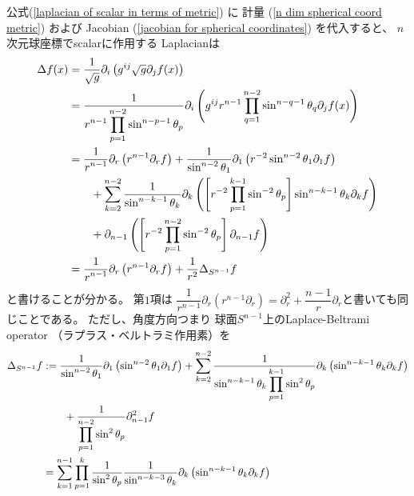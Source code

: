 公式(\ref{laplacian of scalar in terms of metric})
に
計量
(\ref{n dim spherical coord metric})
および
Jacobian
(\ref{jacobian for spherical coordinates})
を代入すると、
$n$次元球座標でscalarに作用する
Laplacianは
\begin{align}
    \Delta f(x)
&=
    \dfrac{1}{ \sqrt {g} }
    \partial_i
    \left(
        g^{ij}
        \sqrt{ g }
        \partial_j
        f (x)
    \right)
\notag\\&
=
    \dfrac{1}{
    \displaystyle
        r^{n-1}
        \prod_{p = 1}^{n-2}
        \sin^{n - p - 1} \theta_p
    }
    \partial_i
    \left(
        g^{ij}
        r^{n-1}
        \prod_{q = 1}^{n-2}
        \sin^{n - q - 1} \theta_q
        \partial_j
        f (x)
    \right)
\notag\\&
=
    \dfrac{1}{
    \displaystyle
        r^{n-1}
    }
    \partial_r
    \left(
        r^{n-1}
        \partial_r
        f
    \right)
+
    \dfrac{1}{
    \displaystyle
        \sin^{n - 2} \theta_1
    }
    \partial_1
    \left(
        r^{-2}
        \sin^{n - 2} \theta_1
        \partial_1
        f
    \right)
\notag\\&\qquad
+
\sum_{k = 2}^{n-2}
    \dfrac{1}{
    \displaystyle
        \sin^{n - k - 1} \theta_k
    }
    \partial_k
    \left(
    \left[
        r^{-2}
        \prod_{p=1}^{k-1}
        \sin^{-2} \theta_p
    \right]
        \sin^{n - k - 1} \theta_k
        \partial_k
        f
    \right)
\notag\\&\qquad
+
    \partial_{n-1}
    \left(
        \left[
            r^{-2}
            \prod_{p=1}^{n-2}
            \sin^{-2} \theta_p
        \right]
        \partial_{n-1}
        f
    \right)
\notag\\&
=
    \dfrac{1}{
    \displaystyle
        r^{n-1}
    }
    \partial_r
    \left(
        r^{n-1}
        \partial_r
        f
    \right)
+
    \dfrac{1}{r^2}
        \Delta_{S^{n-1}}
        f
\end{align}
と書けることが分かる。
第$1$項は
$    \dfrac{1}{
    \displaystyle
        r^{n-1}
    }
    \partial_r
    \left(
        r^{n-1}
        \partial_r
    \right)
=
    \partial_r^2
    +
    \dfrac{n-1}{ r }
        \partial_r
$と書いても同じことである。
ただし、角度方向つまり
球面$S^{n-1}$上のLaplace-Beltrami operator
（ラプラス・ベルトラミ作用素）を
\begin{align}
    \Delta_{S^{n-1}} f
&:=
        \dfrac{1}{
    \displaystyle
        \sin^{n - 2} \theta_1
    }
    \partial_1
    \left(
        \sin^{n - 2} \theta_1
        \partial_1
        f
    \right)
+
\sum_{k = 2}^{n-2}
    \dfrac{1}{
    \displaystyle
        \sin^{n - k - 1} \theta_k
        \prod_{p=1}^{k-1}
        \sin^{2} \theta_p
    }
    \partial_k
    \left(
        \sin^{n - k - 1} \theta_k
        \partial_k
        f
    \right)
\notag\\&\qquad
+
    \dfrac{1}{
    \displaystyle
        \prod_{p=1}^{n-2}
        \sin^{2} \theta_p
    }
    \partial_{n-1}^2
        f
\notag\\&
=
    \sum_{k = 1}^{n - 1}
    \prod_{p = 1}^{k}
    \dfrac{1}{\sin^2 \theta_p}
    \dfrac{1}{\sin^{n - k - 3} \theta_k}
    \partial_k
    \left(
        \sin^{n - k - 1} \theta_k
        \partial_k
        f
    \right)
\end{align}
